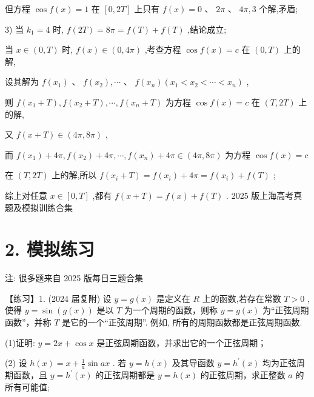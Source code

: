 \documentclass[10pt]{article}
\newcommand*\circled[1]{\tikz[baseline=(char.base)]{\node[shape=circle,draw,inner sep=1.5pt] (char) {\small #1};}}
\begin{document}
但方程 \(\cos f\left( x\right)  = 1\) 在 \(\left\lbrack  {0,{2T}}\right\rbrack\) 上只有 \(f\left( x\right)  = 0\text{ 、 }{2\pi }\text{ 、 }{4\pi },3\) 个解,矛盾;

3) 当 \({k}_{1} = 4\) 时, \(f\left( {2T}\right)  = {8\pi } = f\left( T\right)  + f\left( T\right)\) ,结论成立;

 \circled{3}  当 \(x \in  \left( {0,T}\right)\) 时, \(f\left( x\right)  \in  \left( {0,{4\pi }}\right)\) ,考查方程 \(\cos f\left( x\right)  = c\) 在 \(\left( {0,T}\right)\) 上的解,

设其解为 \(f\left( {x}_{1}\right) \text{ 、 }f\left( {x}_{2}\right) ,\cdots \text{ 、 }f\left( {x}_{n}\right) \left( {{x}_{1} < {x}_{2} < \cdots  < {x}_{n}}\right)\) ,

则 \(f\left( {{x}_{1} + T}\right) ,f\left( {{x}_{2} + T}\right) ,\cdots ,f\left( {{x}_{n} + T}\right)\) 为方程 \(\cos f\left( x\right)  = c\) 在 \(\left( {T,{2T}}\right)\) 上的解,

又 \(f\left( {x + T}\right)  \in  \left( {{4\pi },{8\pi }}\right)\) ,

而 \(f\left( {x}_{1}\right)  + {4\pi },f\left( {x}_{2}\right)  + {4\pi },\cdots ,f\left( {x}_{n}\right)  + {4\pi } \in  \left( {{4\pi },{8\pi }}\right)\) 为方程 \(\cos f\left( x\right)  = c\)

在 \(\left( {T,{2T}}\right)\) 上的解,所以 \(f\left( {{x}_{i} + T}\right)  = f\left( {x}_{i}\right)  + {4\pi } = f\left( {x}_{i}\right)  + f\left( T\right)\) ;

综上对任意 \(x \in  \left\lbrack  {0,T}\right\rbrack\) ,都有 \(f\left( {x + T}\right)  = f\left( x\right)  + f\left( T\right)\) . 2025 版上海高考真题及模拟训练合集

\section*{2. 模拟练习}

注: 很多题来自 2025 版每日三题合集

【练习】1. (2024 届复附) 设 \(y = g\left( x\right)\) 是定义在 \(R\) 上的函数,若存在常数 \(T > 0\) ,使得 \(y = \sin \left( {g\left( x\right) }\right)\) 是以 \(T\) 为一个周期的函数，则称 \(y = g\left( x\right)\) 为“正弦周期函数”，并称 \(T\) 是它的一个“正弦周期”. 例如, 所有的周期函数都是正弦周期函数.

(1)证明: \(y = {2x} + \cos x\) 是正弦周期函数，并求出它的一个正弦周期；

(2) 设 \(h\left( x\right)  = x + \frac{1}{a}\sin {ax}\) . 若 \(y = h\left( x\right)\) 及其导函数 \(y = {h}^{\prime }\left( x\right)\) 均为正弦周期函数，且 \(y = {h}^{\prime }\left( x\right)\) 的正弦周期都是 \(y = h\left( x\right)\) 的正弦周期，求正整数 \(a\) 的所有可能值;
\end{document}
